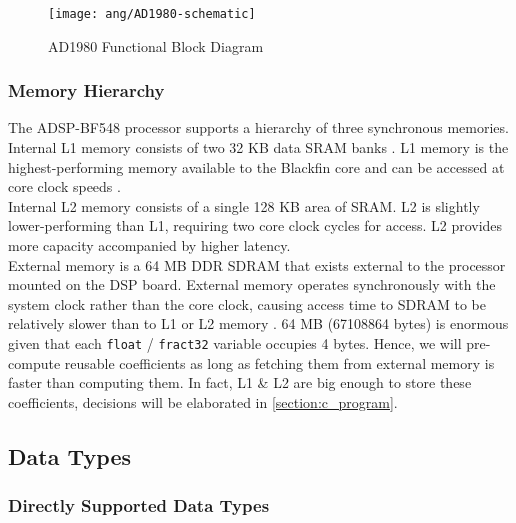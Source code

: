 \begin{figure}[H]
\centering
\texttt{[image: ang/AD1980-schematic]}
\caption{AD1980 Functional Block Diagram}
\label{AD1980-schematic}
\end{figure}


\subsubsection{Memory Hierarchy}
The ADSP-BF548 processor supports a hierarchy of three synchronous memories.\\

Internal L1 memory consists of two 32 KB data SRAM banks \cite{bf54x-hardware}. L1 memory is the highest-performing memory available to the Blackfin core and can be accessed at core clock speeds \cite{start-with-bf548}.\\

Internal L2 memory consists of a single 128 KB area of SRAM. L2 is slightly lower-performing than L1, requiring two core clock cycles for access. L2 provides more capacity accompanied by higher latency. \cite{start-with-bf548}\\

External memory is a 64 MB DDR SDRAM that exists external to the processor mounted on the DSP board. External memory operates synchronously with the system clock rather than the core clock, causing access time to SDRAM to be relatively slower than to L1 or L2 memory \cite{start-with-bf548}. 64 MB (67108864 bytes) is enormous given that each \texttt{float} / \texttt{fract32} variable occupies 4 bytes. Hence, we will pre-compute reusable coefficients as long as fetching them from external memory is faster than computing them. In fact, L1 \& L2 are big enough to store these coefficients, decisions will be elaborated in \autoref{section:c_program}.


\subsection{Data Types}

\subsubsection{Directly Supported Data Types}

